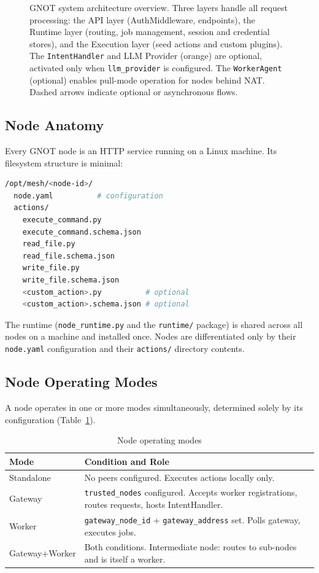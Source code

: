 \documentclass[10pt,twocolumn]{article}
\begin{document}
\begin{figure}[ht]
\begin{tikzpicture}
\end{tikzpicture}
\caption{GNOT system architecture overview. Three layers handle all
request processing: the API layer (AuthMiddleware, endpoints), the
Runtime layer (routing, job management, session and credential stores),
and the Execution layer (seed actions and custom plugins). The
\texttt{IntentHandler} and LLM Provider (orange) are optional,
activated only when \texttt{llm\_provider} is configured. The
\texttt{WorkerAgent} (optional) enables pull-mode operation for nodes
behind NAT. Dashed arrows indicate optional or asynchronous flows.}
\label{fig:arch}
\end{figure}

\subsection{Node Anatomy}

Every GNOT node is an HTTP service running on a Linux machine. Its
filesystem structure is minimal:

\begin{lstlisting}[language=bash, caption={Node directory structure}]
/opt/mesh/<node-id>/
  node.yaml          # configuration
  actions/
    execute_command.py
    execute_command.schema.json
    read_file.py
    read_file.schema.json
    write_file.py
    write_file.schema.json
    <custom_action>.py          # optional
    <custom_action>.schema.json # optional
\end{lstlisting}

The runtime (\texttt{node\_runtime.py} and the \texttt{runtime/} package)
is shared across all nodes on a machine and installed once. Nodes are
differentiated only by their \texttt{node.yaml} configuration and their
\texttt{actions/} directory contents.

\subsection{Node Operating Modes}

A node operates in one or more modes simultaneously, determined solely
by its configuration (Table~\ref{tab:modes}).

\begin{table}[h]
\centering
\caption{Node operating modes}
\label{tab:modes}
\small
\begin{tabular}{@{}lp{5.2cm}@{}}
\toprule
\textbf{Mode} & \textbf{Condition and Role} \\
\midrule
Standalone & No peers configured. Executes actions locally only. \\
Gateway & \texttt{trusted\_nodes} configured. Accepts worker registrations, routes requests, hosts IntentHandler. \\
Worker & \texttt{gateway\_node\_id} + \texttt{gateway\_address} set. Polls gateway, executes jobs. \\
Gateway+Worker & Both conditions. Intermediate node: routes to sub-nodes and is itself a worker. \\
\bottomrule
\end{tabular}
\end{table}
\end{document}
